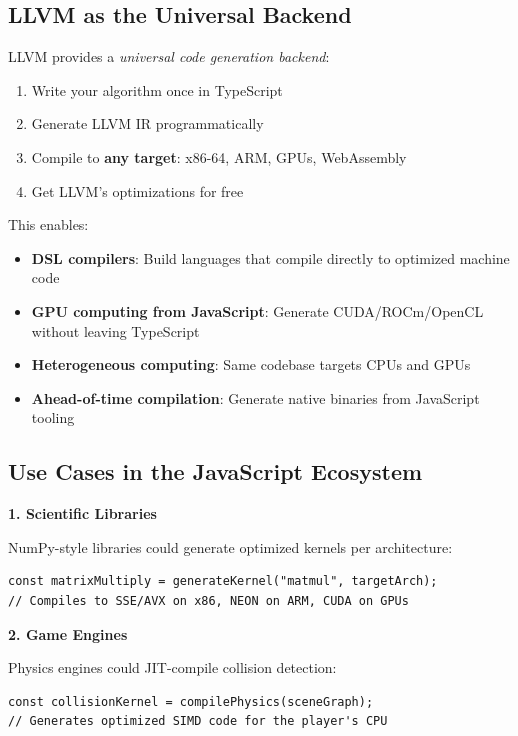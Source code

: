 \documentclass[11pt]{article}
\begin{document}
\subsection{LLVM as the Universal Backend}
LLVM provides a \emph{universal code generation backend}:

\begin{enumerate}[noitemsep]
  \item Write your algorithm once in TypeScript
  \item Generate LLVM IR programmatically
  \item Compile to \textbf{any target}: x86-64, ARM, GPUs, WebAssembly
  \item Get LLVM's optimizations for free
\end{enumerate}

This enables:
\begin{itemize}[noitemsep]
  \item \textbf{DSL compilers}: Build languages that compile directly to optimized machine code
  \item \textbf{GPU computing from JavaScript}: Generate CUDA/ROCm/OpenCL without leaving TypeScript
  \item \textbf{Heterogeneous computing}: Same codebase targets CPUs and GPUs
  \item \textbf{Ahead-of-time compilation}: Generate native binaries from JavaScript tooling
\end{itemize}

\subsection{Use Cases in the JavaScript Ecosystem}

\textbf{1. Scientific Libraries}

NumPy-style libraries could generate optimized kernels per architecture:
\begin{lstlisting}[style=ts]
const matrixMultiply = generateKernel("matmul", targetArch);
// Compiles to SSE/AVX on x86, NEON on ARM, CUDA on GPUs
\end{lstlisting}

\textbf{2. Game Engines}

Physics engines could JIT-compile collision detection:
\begin{lstlisting}[style=ts]
const collisionKernel = compilePhysics(sceneGraph);
// Generates optimized SIMD code for the player's CPU
\end{lstlisting}
\end{document}
